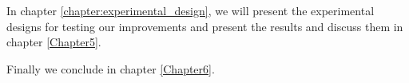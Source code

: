 In chapter \ref{chapter:experimental_design}, we will present the experimental designs for testing our improvements and present the results and discuss them in chapter \ref{Chapter5}.

Finally we conclude in chapter \ref{Chapter6}.



